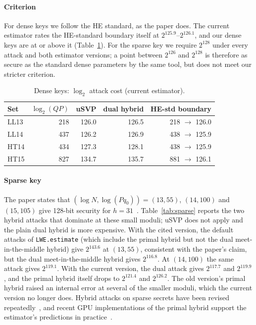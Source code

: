 \documentclass[sigconf,nonacm]{acmart}
\begin{document}
\paragraph{Criterion}
For dense keys we follow the HE standard, as the paper does.
The current estimator rates the HE-standard boundary itself at $2^{125.9}$--$2^{126.1}$, and our dense keys are at or above it (Table~\ref{tab:dense}).
For the sparse key we require $2^{128}$ under every attack and both estimator versions; a point between $2^{126}$ and $2^{128}$ is therefore as secure as the standard dense parameters by the same tool, but does not meet our stricter criterion.

\begin{table}[t]
\caption{Dense keys: $\log_2$ attack cost (current estimator).}
\label{tab:dense}
\small
\begin{tabular}{lrrrr}
\toprule
Set & $\log_2(QP)$ & uSVP & dual hybrid & HE-std boundary \\
\midrule
LL13 & 218 & 126.0 & 126.5 & 218 $\to$ 126.0 \\
LL14 & 437 & 126.2 & 126.9 & 438 $\to$ 125.9 \\
HT14 & 434 & 127.3 & 128.1 & 438 $\to$ 125.9 \\
HT15 & 827 & 134.7 & 135.7 & 881 $\to$ 126.1 \\
\bottomrule
\end{tabular}
\end{table}

\paragraph{Sparse key}
The paper states that $(\log N,\log(Pq_0))=(13,55)$, $(14,100)$ and $(15,105)$ give 128-bit security for $h=31$~\cite[\S5.2]{CHKS25}.
Table~\ref{tab:sparse} reports the two hybrid attacks that dominate at these small moduli; uSVP does not apply and the plain dual hybrid is more expensive.
With the cited version, the default attacks of \texttt{LWE.estimate} (which include the primal hybrid but not the dual meet-in-the-middle hybrid) give $2^{143.6}$ at $(13,55)$, consistent with the paper's claim, but the dual meet-in-the-middle hybrid gives $2^{116.8}$.
At $(14,100)$ the same attack gives $2^{119.1}$.
With the current version, the dual attack gives $2^{117.7}$ and $2^{119.9}$, and the primal hybrid itself drops to $2^{121.4}$ and $2^{126.2}$.
The old version's primal hybrid raised an internal error at several of the smaller moduli, which the current version no longer does.
Hybrid attacks on sparse secrets have been revised repeatedly~\cite{SC19,CP19,SecGuide24}, and recent GPU implementations of the primal hybrid support the estimator's predictions in practice~\cite{PV25}.
\end{document}
